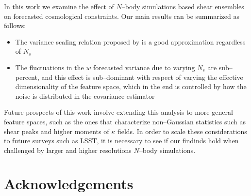 \documentclass[reprint,aps,prd,superscriptaddress,showkeys,showpacs]{revtex4-1}
\begin{document}
In this work we examine the effect of $N$--body simulations based shear ensembles on forecasted cosmological constraints. Our main results can be summarized as follows:

\begin{itemize}
\item The variance scaling relation proposed by \citep{DodelsonSchneider13} is a good approximation regardless of $N_s$
\item The fluctuations in the $w$ forecasted variance due to varying $N_s$ are sub--percent, and this effect is sub--dominant with respect of varying the effective dimensionality of the feature space, which in the end is controlled by how the noise is distributed in the covariance estimator
\end{itemize}
%
Future prospects of this work involve extending this analysis to more general feature spaces, such as the ones that characterize non--Gaussian statistics such as shear peaks and higher moments of $\kappa$ fields. In order to scale these considerations to future surveys such as LSST, it is necessary to see if our findinds hold when challenged by larger and higher resolutions $N$--body simulations.  

 

\section*{Acknowledgements}



\label{lastpage}
\end{document}
